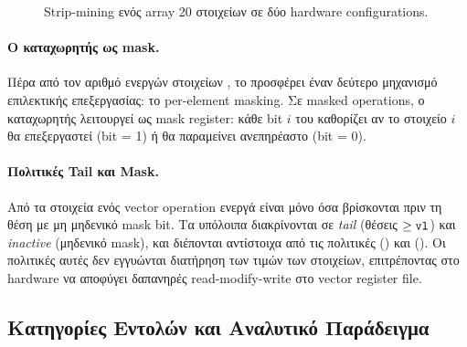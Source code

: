 \begin{figure}[htbp]
  \centering
  
  \caption{Strip-mining ενός array \num{20} στοιχείων σε δύο hardware
    configurations.}
  \label{fig:strip-mining-vis}
\end{figure}

\paragraph{Ο καταχωρητής  ως mask.}
Πέρα από τον αριθμό ενεργών στοιχείων , το \RVV προσφέρει έναν
δεύτερο μηχανισμό επιλεκτικής επεξεργασίας: το per-element masking. Σε
masked operations, ο καταχωρητής  λειτουργεί ως mask register:
κάθε bit $i$ του  καθορίζει αν το στοιχείο $i$ θα επεξεργαστεί
(bit = 1) ή θα παραμείνει ανεπηρέαστο (bit = 0).

\paragraph{Πολιτικές Tail και Mask.}
Από τα στοιχεία ενός vector operation ενεργά είναι μόνο όσα βρίσκονται πριν
τη θέση  με μη μηδενικό mask bit. Τα υπόλοιπα διακρίνονται σε
\emph{tail} (θέσεις $\ge \texttt{vl}$) και \emph{inactive} (μηδενικό mask), και
διέπονται αντίστοιχα από τις πολιτικές  () και
 (). Οι πολιτικές αυτές δεν εγγυώνται διατήρηση των τιμών  
των στοιχείων, επιτρέποντας στο hardware να αποφύγει δαπανηρές read-modify-write στο
vector register file.

\subsection{Κατηγορίες Εντολών και Αναλυτικό Παράδειγμα}
\label{ssec:rvv-xor-example}

